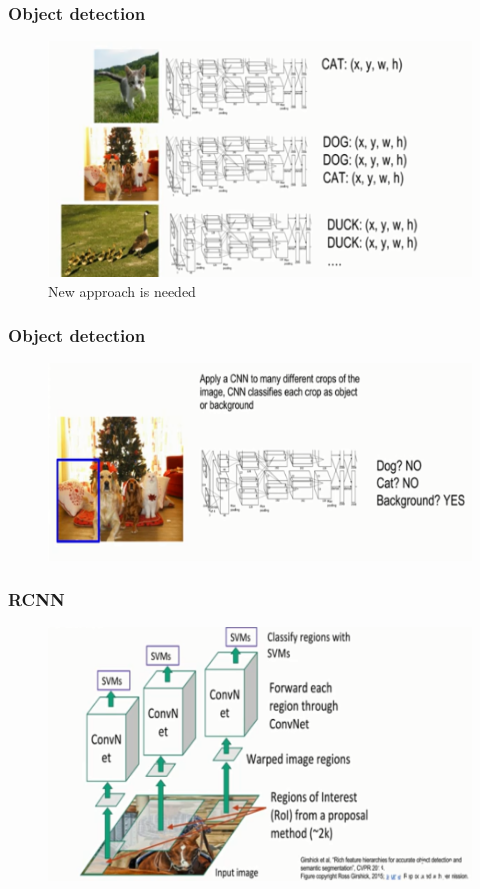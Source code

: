 \documentclass{beamer}
\begin{document}
\begin{frame}
	\frametitle{Object detection}
	\begin{figure}
		\includegraphics[width=\linewidth]{Pics/objectdetect.PNG}
		\caption{{\color{red}New approach is needed}}
	\end{figure}
	
\end{frame}
\begin{frame}
	\frametitle{Object detection}
	
	\begin{figure}
		\includegraphics[width=\linewidth]{Pics/objectdetect2.PNG}
		
	\end{figure}
	
\end{frame}
\begin{frame}
	\frametitle{RCNN}
	
	\begin{figure}
		\includegraphics[width=\linewidth]{Pics/rcnn.PNG}
		
	\end{figure}
	
\end{frame}
\end{document}
